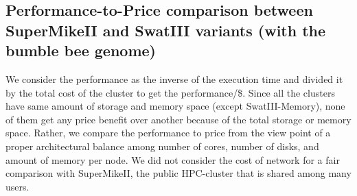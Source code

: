 \documentclass[conference]{IEEEtran}
\begin{document}
\subsection {Performance-to-Price comparison between SuperMikeII and SwatIII variants (with the bumble bee genome)} \label{PriceToPerformanceBumbleBee}
We consider the performance as the inverse of the execution time and divided it by the total cost of the cluster to get the performance/\$.
Since all the clusters have same amount of storage and memory space (except SwatIII-Memory), none of them get any price benefit over another because of the total storage or memory space.   
Rather, we compare the performance to price from the view point of a proper architectural balance among number of cores, number of disks, and amount of memory per node.
We did not consider the cost of network for a fair comparison with SuperMikeII, the public HPC-cluster that is shared among many users.
\end{document}
